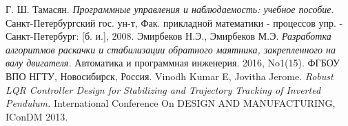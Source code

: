  Г. Ш. Тамасян. \textit{Программные управления и наблюдаемость: учебное пособие.} Санкт-Петербургский гос. ун-т, Фак. прикладной математики - процессов упр. - Санкт-Петербург: [б. и.], 2008.
\bibitem{}Эмирбеков Н.Э., Эмирбеков М.Э. \textit{Разработка алгоритмов раскачки и стабилизации обратного маятника, закрепленного на валу двигателя.} Автоматика и программная инженерия. 2016, No1(15). ФГБОУ ВПО НГТУ, Новосибирск, Россия.
\bibitem{}Vinodh Kumar E, Jovitha Jerome. \textit{Robust LQR Controller Design for Stabilizing and Trajectory Tracking of Inverted Pendulum.} International Conference On DESIGN AND MANUFACTURING, IConDM 2013.
